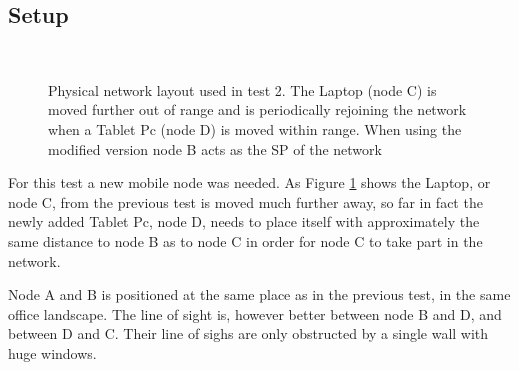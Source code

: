 \subsection{Setup}
\begin{figure}[h]
	\centering
	\\
	\caption{Physical network layout used in test 2. The Laptop (node C) is moved further out of range and is periodically rejoining the network when a Tablet Pc (node D) is moved within range. When using the modified version node B acts as the SP of the network}
	\label{fig:setup_test_2}
\end{figure}

For this test a new mobile node was needed. As Figure \ref{fig:setup_test_2}
shows the Laptop, or node C, from the previous test is moved much further away,
so far in fact the newly added Tablet Pc, node D, needs to place itself with
approximately the same distance to node B as to node C in order for node C to
take part in the network.

Node A and B is positioned at the same place as in the previous test, in the
same office landscape. The line of sight is, however better between node B and
D, and between D and C. Their line of sighs are only obstructed by a single wall
with huge windows.

